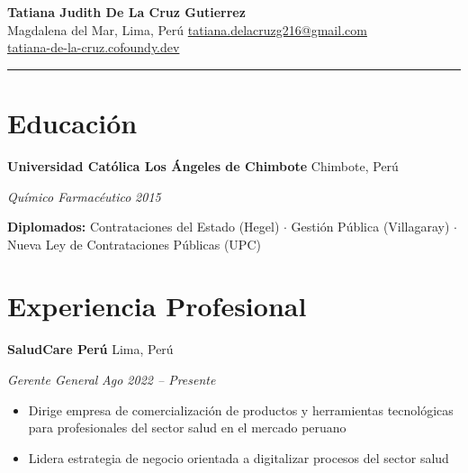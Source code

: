 \documentclass[10.5pt,letterpaper]{article}
\newcommand{\entry}[4]{%
  \noindent\textbf{#1} \hfill #2 \par\nopagebreak
  \textit{#3} \hfill \textit{#4} \par\nopagebreak
}
\begin{document}
\begin{center}
  {\LARGE\bfseries Tatiana Judith De La Cruz Gutierrez} \\[4pt]
  \enspace Magdalena del Mar, Lima, Per\'u
  \quad{}\enspace \href{mailto:tatiana.delacruzg216@gmail.com}{tatiana.delacruzg216@gmail.com}
  \quad{}
  \\[2pt]
  \enspace \href{https://tatiana-de-la-cruz.cofoundy.dev}{tatiana-de-la-cruz.cofoundy.dev}
\end{center}

\vspace{-0.4em}
\noindent\rule{\textwidth}{0.8pt}
\vspace{-0.8em}

\section{Educaci\'on}

\entry{Universidad Cat\'olica Los \'Angeles de Chimbote}{Chimbote, Per\'u}{Qu\'imico Farmac\'eutico}{2015}
\vspace{0.3em}

\noindent\textbf{Diplomados:} Contrataciones del Estado (Hegel) $\cdot$ Gesti\'on P\'ublica (Villagaray) $\cdot$ Nueva Ley de Contrataciones P\'ublicas (UPC)
\vspace{0.3em}

\section{Experiencia Profesional}

\entry{SaludCare Per\'u}{Lima, Per\'u}{Gerente General}{Ago 2022 -- Presente}
\begin{itemize}
  \item Dirige empresa de comercializaci\'on de productos y herramientas tecnol\'ogicas para profesionales del sector salud en el mercado peruano
  \item Lidera estrategia de negocio orientada a digitalizar procesos del sector salud
\end{itemize}
\vspace{0.3em}
\end{document}
